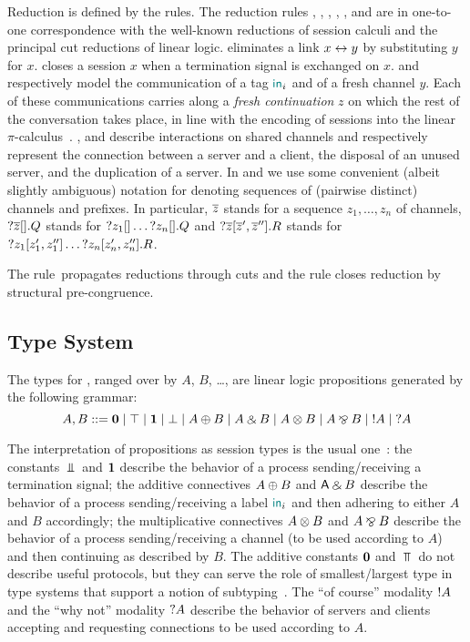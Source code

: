 Reduction is defined by the  rules.
%
The reduction rules \RLink, \RClose, \RSelect, \RFork, \RConnect, \RWeaken and
\RContract are in one-to-one correspondence with the well-known reductions of
session calculi and the principal cut reductions of linear logic. \RLink
eliminates a link $x\leftrightarrow y$ by substituting $y$ for $x$. \RClose closes a
session $x$ when a termination signal is exchanged on $x$. \RSelect and \RFork
respectively model the communication of a tag $\mathsf{\color{teal}in}_i$ and of a fresh channel
$y$. Each of these communications carries along a \emph{fresh continuation} $z$
on which the rest of the conversation takes place, in line with the encoding of
sessions into the linear
$\pi$-calculus~\cite{KobayashiPierceTurner99,Kobayashi02b,DardhaGiachinoSangiorgi17}.
%
\RConnect, \RWeaken and \RContract describe interactions on shared channels and
respectively represent the connection between a server and a client, the
disposal of an unused server, and the duplication of a server. In \RWeaken and
\RContract we use some convenient (albeit slightly ambiguous) notation for
denoting sequences of (pairwise distinct) channels and prefixes. In particular,
$\overline{z}$ stands for a sequence $z_1, \dots, z_n$ of channels,
${?}\overline{z}[].Q$ stands for ${?}z_1[]\dots{?}z_n[].Q$ and
${?}\overline{z}[\overline{z}',\overline{z}''].R$ stands for
${?}z_1[z_1',z_1'']\dots{?}z_n[z_n',z_n''].R$.

The rule~\RCut propagates reductions through cuts and the rule \RCong closes
reduction by structural pre-congruence.

\subsection{Type System}
\label{sec:typing-rules}

The types for \Calculus, ranged over by $A$, $B$, \dots, are linear logic
 propositions generated by the following grammar:
\[
    A, B ::= \Zero \mid \Top \mid \One \mid \Bot \mid A \Plus B \mid A \With B \mid A \Ten B \mid A \Par B \mid \OfCourse A \mid \WhyNot A
\]

The interpretation of propositions as session types is the usual
one~\cite{Wadler14}: the constants $\Bot$ and $\mathbf{1}$ describe the behavior of a
process sending/receiving a termination signal; the additive connectives $A
\mathbin\oplus B$ and $\mathsf{A} \mathbin\binampersand B$ describe the behavior of a process sending/receiving a
label $\mathsf{\color{teal}in}_i$ and then adhering to either $A$ and $B$ accordingly; the
multiplicative connectives $A \mathbin\otimes B$ and $A \mathbin\bindnasrepma B$ describe the behavior of a
process sending/receiving a channel (to be used according to $A$) and then
continuing as described by $B$. The additive constants $\mathbf{0}$ and $\Top$ do not
describe useful protocols, but they can serve the role of smallest/largest type
in type systems that support a notion of subtyping~\citep{HornePadovani24}. The
``of course'' modality $\OfCourse A$ and the ``why not'' modality $\WhyNot A$
describe the behavior of servers and clients accepting and requesting
connections to be used according to $A$.

